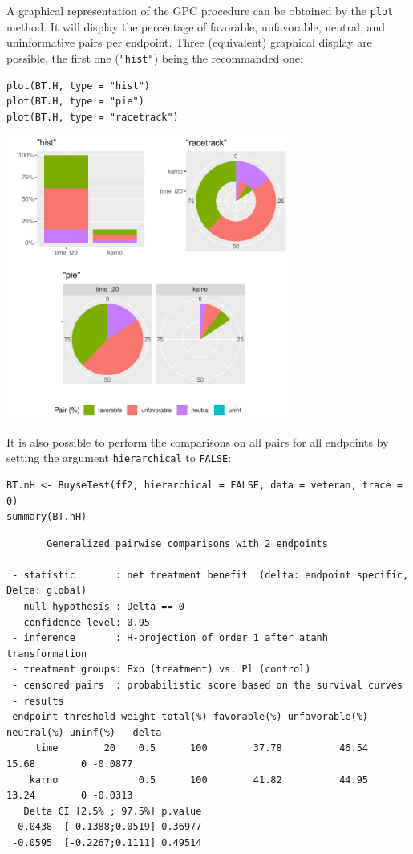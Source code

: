 \documentclass[12pt]{article}
\begin{document}
\bigskip

A graphical representation of the GPC procedure can be obtained by the
\texttt{plot} method. It will display the percentage of favorable,
unfavorable, neutral, and uninformative pairs per endpoint. Three
(equivalent) graphical display are possible, the first one (\texttt{"hist"})
being the recommanded one:
\lstset{language=r,label= ,caption= ,captionpos=b,numbers=none}
\begin{lstlisting}
plot(BT.H, type = "hist")
plot(BT.H, type = "pie")
plot(BT.H, type = "racetrack")
\end{lstlisting}

\begin{center}
\includegraphics[trim={0 0 0 0},width=0.7\textwidth]{./figures/plot-BuyseTest.pdf}
\end{center}


\bigskip

It is also possible to perform the comparisons on all pairs for all
endpoints by setting the argument \texttt{hierarchical} to \texttt{FALSE}:
\lstset{language=r,label= ,caption= ,captionpos=b,numbers=none}
\begin{lstlisting}
BT.nH <- BuyseTest(ff2, hierarchical = FALSE, data = veteran, trace = 0)
summary(BT.nH)
\end{lstlisting}

\begin{verbatim}
       Generalized pairwise comparisons with 2 endpoints

 - statistic       : net treatment benefit  (delta: endpoint specific, Delta: global) 
 - null hypothesis : Delta == 0 
 - confidence level: 0.95 
 - inference       : H-projection of order 1 after atanh transformation 
 - treatment groups: Exp (treatment) vs. Pl (control) 
 - censored pairs  : probabilistic score based on the survival curves
 - results
 endpoint threshold weight total(%) favorable(%) unfavorable(%) neutral(%) uninf(%)   delta
     time        20    0.5      100        37.78          46.54      15.68        0 -0.0877
    karno              0.5      100        41.82          44.95      13.24        0 -0.0313
   Delta CI [2.5% ; 97.5%] p.value 
 -0.0438  [-0.1388;0.0519] 0.36977 
 -0.0595  [-0.2267;0.1111] 0.49514
\end{verbatim}
\end{document}
